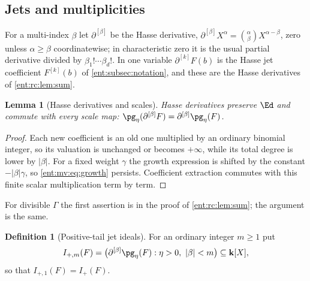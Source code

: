 \documentclass[11pt]{article}
\theoremstyle{plain}
\newtheorem{lemma}[lemma]{Lemma}
\theoremstyle{plain}
\theoremstyle{plain}
\theoremstyle{definition}
\newtheorem{definition}[definition]{Definition}
\theoremstyle{definition}
\theoremstyle{definition}
\theoremstyle{definition}
\theoremstyle{remark}
\newcommand{\kk}{\mathbf k}\newcommand{\PP}{\mathbb P}
\begin{document}
\subsection{Jets and multiplicities}
\label{ent:as:subsec:jets}

For a multi-index $\beta$ let $\partial^{[\beta]}$ be the Hasse derivative,
$\partial^{[\beta]}X^\alpha=\binom\alpha\beta X^{\alpha-\beta}$, zero unless
$\alpha\ge\beta$ coordinatewise; in characteristic zero it is the usual partial
derivative divided by $\beta_1!\cdots\beta_d!$. In one variable
$\partial^{[k]}F(b)$ is the Hasse jet coefficient $F^{[k]}(b)$ of
\cref{ent:subsec:notation}, and these are the Hasse derivatives of
\cref{ent:rc:lem:sum}.

\begin{lemma}[Hasse derivatives and scales]\label{ent:as:lem:hasse}
Hasse derivatives preserve $\Ed$ and commute with every scale map:
$\pg_\eta(\partial^{[\beta]}F)=\partial^{[\beta]}\pg_\eta(F)$.
\end{lemma}
\begin{proof}
Each new coefficient is an old one multiplied by an ordinary binomial integer,
so its valuation is unchanged or becomes $+\infty$, while its total degree is
lower by $|\beta|$. For a fixed weight $\gamma$ the growth expression is shifted
by the constant $-|\beta|\gamma$, so \eqref{ent:mv:eq:growth} persists.
Coefficient extraction commutes with this finite scalar multiplication term by
term.
\end{proof}

For divisible $\Gamma$ the first assertion is in the proof of
\cref{ent:rc:lem:sum}; the argument is the same.

\begin{definition}[Positive-tail jet ideals]\label{ent:as:def:jet-ideal}
For an ordinary integer $m\ge1$ put
\[
 I_{+,m}(F)=\bigl(\partial^{[\beta]}\pg_\eta(F):\eta>0,\ |\beta|<m\bigr)
 \subseteq\kk[X],
\]
so that $I_{+,1}(F)=I_+(F)$.
\end{definition}
\end{document}
